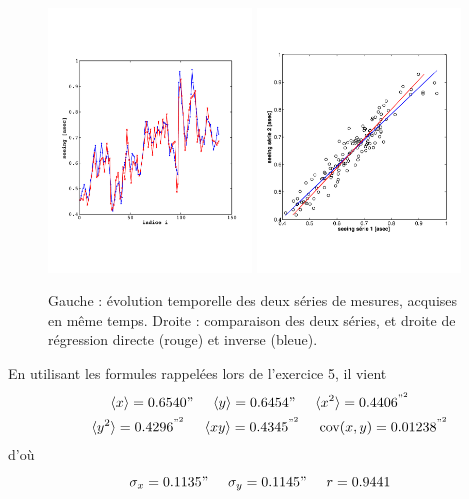 \begin{figure}[htb]
   \centering
   \includegraphics[height=7cm]{assets/figures/exe60.pdf}\hspace{10mm}
   \includegraphics[height=7cm]{assets/figures/exe6.pdf}
   \caption{Gauche : évolution temporelle des deux séries de mesures, acquises en même temps. Droite : comparaison des deux séries, et droite de régression directe (rouge) et inverse (bleue).}
\end{figure}
En utilisant les formules rappelées lors de l'exercice 5, il vient
\begin{gather*}
\langle x \rangle=0.6540"
\hspace{0.5cm}\langle y \rangle=0.6454"
\hspace{0.5cm}\langle x^2 \rangle=0.4406^{"^{2}}\\
\hspace{0.5cm}\langle y^2 \rangle=0.4296^{"^{2}}
\hspace{0.5cm}\langle xy \rangle=0.4345^{"^{2}}
\hspace{0.5cm}\text{cov}(x,y)=0.01238^{"^{2}}
\end{gather*}
d'où
$$
\sigma_x=0.1135"\hspace{0.5cm}\sigma_y=0.1145"\hspace{0.5cm}r=0.9441
$$

